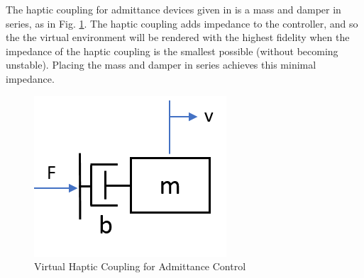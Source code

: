 \documentclass[12pt]{report}
\begin{document}
	
	
	
	


	
%


	


The haptic coupling for admittance devices given in \cite{Adams1999} is a mass and damper in series, as in Fig. \ref{fig:haptic_coupling_original}. The haptic coupling adds impedance to the controller, and so the the virtual environment will be rendered with the highest fidelity when the impedance of the haptic coupling is the smallest possible (without becoming unstable). Placing the mass and damper in series achieves this minimal impedance.  	

	
	\begin{figure}[h] 
	\centering
\includegraphics[width=0.3\linewidth]{haptic_coupling_original}
		\caption{Virtual Haptic Coupling for Admittance Control}
		\label{fig:haptic_coupling_original}
	\end{figure} 
	
\end{document}
